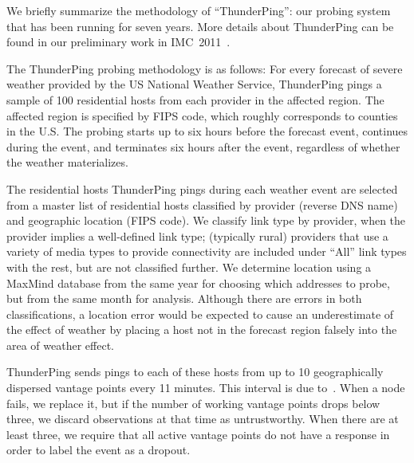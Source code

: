 We briefly summarize the methodology of ``ThunderPing'': our probing
system that has been running for seven years.
%
More details about ThunderPing can be found in our preliminary work in
IMC~2011~\cite{pingin}.
%

The ThunderPing probing methodology is as follows:
%
For every forecast of severe weather provided by the US National Weather
Service, ThunderPing pings a sample of 100 residential hosts from each
provider in the affected region.  The affected region is specified by FIPS code, which roughly
corresponds to counties in the U.S.
%
The probing starts up to six hours before the forecast event, continues during the
event, and terminates six hours after the event, regardless of whether the weather
materializes.
 
The residential hosts ThunderPing pings during each weather event are selected
from a master list of residential hosts classified by provider (reverse DNS
name) and geographic location (FIPS code).  We classify link type by
provider, when the provider implies a well-defined link type; (typically rural) providers that
use a variety of media types to provide connectivity are included under ``All'' link
types with the rest, but are not classified further.  We determine location using a 
MaxMind database from the same year for choosing which addresses to probe, but from the same
month for analysis. Although there are errors in both classifications, a location error
would be expected to cause an underestimate of the effect of weather by placing a host
not in the forecast region falsely into the area of weather effect.
 
ThunderPing sends pings to each of these hosts from up to 10 geographically
dispersed \planetlab vantage points every 11 minutes.  This interval is due to~\cite{imc08-heidemann}.
When a \planetlab node fails, we replace it, but if the number of working vantage points
drops below three, we discard observations at that time as untrustworthy.
%
When there are at least three, we require
that all active vantage points do not have a response in order to label the event as a dropout.
  
